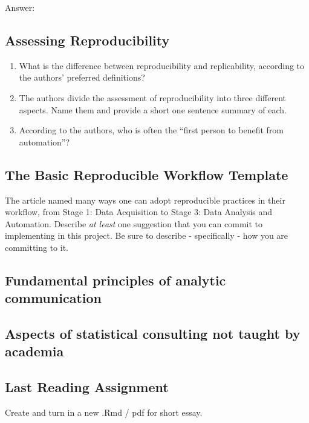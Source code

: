 \documentclass[
]{article}
\begin{document}
Answer:

\hypertarget{assessing-reproducibility}{%
\subsection{Assessing Reproducibility}\label{assessing-reproducibility}}

\begin{enumerate}
\def\labelenumi{\arabic{enumi}.}
\item
  What is the difference between reproducibility and replicability,
  according to the authors' preferred definitions?
\item
  The authors divide the assessment of reproducibility into three
  different aspects. Name them and provide a short one sentence summary
  of each.
\item
  According to the authors, who is often the ``first person to benefit
  from automation''?
\end{enumerate}

\hypertarget{the-basic-reproducible-workflow-template}{%
\subsection{The Basic Reproducible Workflow
Template}\label{the-basic-reproducible-workflow-template}}

The article named many ways one can adopt reproducible practices in
their workflow, from Stage 1: Data Acquisition to Stage 3: Data Analysis
and Automation. Describe \emph{at least} one suggestion that you can
commit to implementing in this project. Be sure to describe -
specifically - how you are committing to it.

\hypertarget{fundamental-principles-of-analytic-communication}{%
\subsection{Fundamental principles of analytic
communication}\label{fundamental-principles-of-analytic-communication}}

\hypertarget{aspects-of-statistical-consulting-not-taught-by-academia}{%
\subsection{Aspects of statistical consulting not taught by
academia}\label{aspects-of-statistical-consulting-not-taught-by-academia}}

\hypertarget{last-reading-assignment}{%
\subsection{Last Reading Assignment}\label{last-reading-assignment}}

Create and turn in a new .Rmd / pdf for short essay.
\end{document}
